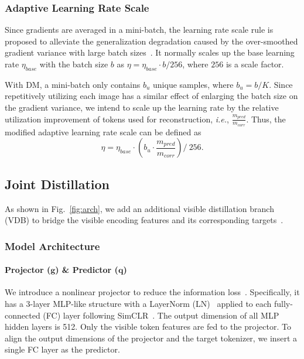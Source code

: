 \documentclass[lettersize,journal]{IEEEtran}
\begin{document}
\subsubsection{Adaptive Learning Rate Scale}
Since gradients are averaged in a mini-batch, the learning rate scale rule is proposed to alleviate the generalization degradation caused by the over-smoothed gradient variance with large batch sizes~\cite{2017arXiv170602677G}. It normally scales up the base learning rate $\eta_{base}$ with the batch size $b$ as $\eta = \eta_{base} \cdot b/256$, where $256$ is a scale factor. 

With DM, a mini-batch only contains $b_u$ unique samples, where $b_u = b/K$. Since repetitively utilizing each image has a similar effect of enlarging the batch size on the gradient variance, we intend to scale up the learning rate by the relative utilization improvement of tokens used for reconstruction, \textit{i.e.}, $\frac{m_{pred}}{m_{corr}}$.
 Thus, the modified adaptive learning rate scale can be defined as
\begin{equation}
  \eta = \eta_{base} \cdot \left(b_u \cdot \frac{m_{pred}}{m_{corr}}\right) /\ 256.
\end{equation}

\subsection{Joint Distillation}
As shown in Fig.~\ref{fig:arch}, we add an additional visible distillation branch (VDB) to bridge the visible encoding features and its corresponding targets~\cite{2021arXiv211209133W, Baevski2022data2vecAG, 2022arXiv220514141W}.
\subsubsection{Model Architecture}
\paragraph{Projector ($\bm{g}$) \& Predictor ($\bm{q}$)}
We introduce a nonlinear projector to reduce the information loss~\cite{2020arXiv200205709C}.
Specifically, it has a 3-layer MLP-like structure with a LayerNorm (LN)~\cite{2016arXiv160706450L} applied to each fully-connected (FC) layer following SimCLR~\cite{2020arXiv200205709C}. The output dimension of all MLP hidden layers is 512. Only the visible token features are fed to the projector.
To align the output dimensions of the projector and the target tokenizer, we insert a single FC layer as the predictor.
\end{document}
